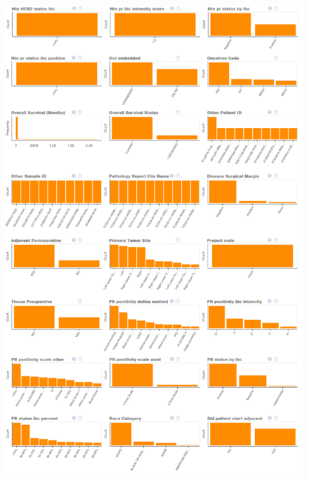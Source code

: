 \begin{figure}
	\centering
	\includegraphics[width=1
	\linewidth]{NOTEBOOK/IMAGES_EDA/4}
\end{figure}

